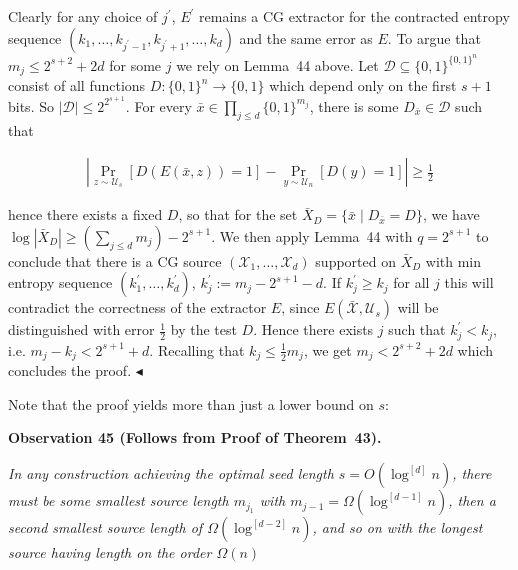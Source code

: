 \documentclass[10pt,a4paper]{article}
\begin{document}
Clearly for any choice of $j^{\prime}$, $E^{\prime}$ remains a CG extractor for the contracted entropy sequence $(k_{1},\ldots,k_{j^{\prime}-1},k_{j^{\prime}+1},\ldots,k_{d})$ and the same error as $E$.
To argue that $m_{j}\leq 2^{s+2}+2d$ for some $j$ we rely on Lemma 44 above. Let $\mathcal{D}\subseteq\{0,1\}^{\{0,1\}^{n}}$ consist of all functions $D:\{0,1\}^{n}\to\{0,1\}$ which depend only on the first $s+1$ bits. So $|\mathcal{D}|\leq 2^{2^{s+1}}$. For every $\bar{x}\in\prod_{j\leq d}\{0,1\}^{m_{j}}$, there is some $D_{\bar{x}}\in\mathcal{D}$ such that\par


\[\begin{gathered}
|\Pr_{z\sim\mathcal{U}_{s}}[D(E(\bar{x},z))=1]-\Pr_{y\sim\mathcal{U}_{n}}[D(y)=1]|\geq\frac{1}{2}
\end{gathered}\]


hence there exists a fixed $D$, so that for the set $\bar{X}_{D}=\{\bar{x}\mid D_{\bar{x}}=D\}$,
we have $\log|\bar{X}_{D}|\geq(\sum_{j\leq d}m_{j})-2^{s+1}$. We then apply Lemma 44 with $q=2^{s+1}$ to conclude that there is a CG source $(\mathcal{X}_{1},\ldots,\mathcal{X}_{d})$ supported on $\bar{X}_{D}$ with min entropy sequence $(k^{\prime}_{1},\ldots,k^{\prime}_{d})$, $k^{\prime}_{j}:=m_{j}-2^{s+1}-d$. If $k^{\prime}_{j}\geq k_{j}$ for all $j$ this will contradict the correctness of the extractor $E$, since $E(\bar{\mathcal{X}},\mathcal{U}_{s})$ will be distinguished with error $\frac{1}{2}$ by the test $D$. Hence there exists $j$ such that $k^{\prime}_{j}<k_{j}$, i.e. $m_{j}-k_{j}<2^{s+1}+d$. Recalling that $k_{j}\leq\frac{1}{2}m_{j}$, we get $m_{j}<2^{s+2}+2d$ which concludes the proof.
$\blacktriangleleft$\par




Note that the proof yields more than just a lower bound on $s$:\par





\par\medskip\noindent\textbf{
\textbf{Observation 45}\textbf{ }(Follows from Proof of Theorem 43)\textbf{.}
}\par



\emph{In any construction achieving the optimal seed length $s=O(\log^{[d]}n)$, there must be some smallest source length $m_{j_{1}}$ with $m_{j-1}=\Omega(\log^{[d-1]}n)$, then a second smallest source length of $\Omega(\log^{[d-2]}n)$, and so on with the longest source having length on the order $\Omega(n)$}\par
\end{document}
